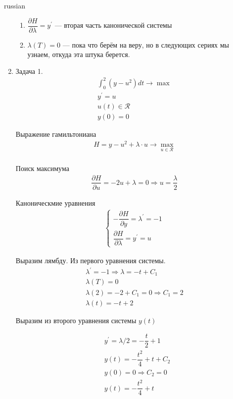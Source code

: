 \documentclass{article}
\begin{document}
\begin{otherlanguage*}{russian}
\begin{enumerate}
\begin{enumerate}
\item $ \dfrac{\partial H}{\partial \lambda} = y^{'} $ --- вторая часть канонической системы 
\item  $ \lambda(T) = 0 $  --- пока что берём на веру, но в следующих сериях мы узнаем, откуда эта штука берется. 
\end{enumerate}
\item Задача 1. 
\begin{align*}
\int_0^2 (y - u^2) dt \rightarrow \max \\
y^{'} = u \\
u(t) \in \mathcal{R} \\
y(0) = 0 
\end{align*}

Выражение гамильтониана
\begin{align*}
H = y - u ^ 2 + \lambda \cdot u \rightarrow \max_{u \in \mathcal{R}} \\
\end{align*}

Поиск максимума 
\begin{align*}
\dfrac{\partial H}{\partial u}  = - 2 u + \lambda = 0 \Rightarrow u = \dfrac{\lambda}{2} 
\end{align*}

Каноническмие уравнения 
\begin{align*}
\begin{cases}
- \dfrac{\partial H}{\partial y}  = \lambda^{'} =  -1 \\
\dfrac{\partial H}{\partial \lambda} = y^{'} = u  
\end{cases} 
\end{align*}

Выразим лямбду. Из первого уравнения системы.
\begin{align*}
\lambda^{'} = -1 \Rightarrow \lambda = -t + C_1 \\ 
\lambda(T) = 0 \\
\lambda(2) = - 2 + C_1 = 0 \Rightarrow C_1 = 2 \\
\lambda(t) = -t  + 2 
\end{align*}

Выразим из второго уравнения системы $ y(t) $ 

\begin{align*}
&y^{'} = \lambda /2  = - \dfrac{t}{2}  + 1 \\
&y(t) = - \dfrac{t^2}{4} + t + C_2 \\
&y(0) = 0 \Rightarrow C_2 = 0 \\
&y(t) =  - \dfrac{t^2}{4} + t 
\end{align*}


\end{enumerate}
\end{otherlanguage*}
\end{document}
